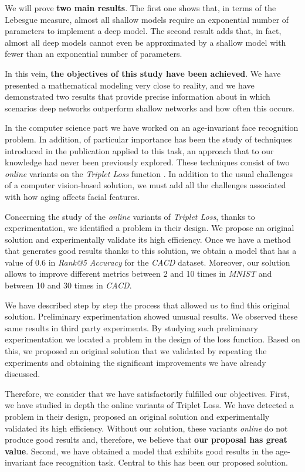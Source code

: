 We will prove \textbf{two main results}. The first one shows that, in terms of the Lebesgue measure, almost all shallow models require an exponential number of parameters to implement a deep model. The second result adds that, in fact, almost all deep models cannot even be approximated by a shallow model with fewer than an exponential number of parameters.

In this vein, \textbf{the objectives of this study have been achieved}. We have presented a mathematical modeling very close to reality, and we have demonstrated two results that provide precise information about in which scenarios deep networks outperform shallow networks and how often this occurs.

In the computer science part we have worked on an age-invariant face recognition problem. In addition, of particular importance has been the study of techniques introduced in the \cite{informatica:principal} publication applied to this task, an approach that to our knowledge had never been previously explored. These techniques consist of two \textit{online} variants on the \textit{Triplet Loss} function \cite{informatica:principal}. In addition to the usual challenges of a computer vision-based solution, we must add all the challenges associated with how aging affects facial features.

Concerning the study of the \textit{online} variants of \textit{Triplet Loss}, thanks to experimentation, we identified a problem in their design. We propose an original solution and experimentally validate its high efficiency. Once we have a method that generates good results thanks to this solution, we obtain a model that has a value of 0.6 in \textit{Rank@5 Accuracy} for the \textit{CACD} dataset. Moreover, our solution allows to improve different metrics between 2 and 10 times in \textit{MNIST} and between 10 and 30 times in \textit{CACD}.

We have described step by step the process that allowed us to find this original solution. Preliminary experimentation showed unusual results. We observed these same results in third party experiments. By studying such preliminary experimentation we located a problem in the design of the loss function. Based on this, we proposed an original solution that we validated by repeating the experiments and obtaining the significant improvements we have already discussed.

Therefore, we consider that we have satisfactorily fulfilled our objectives. First, we have studied in depth the online variants of Triplet Loss. We have detected a problem in their design, proposed an original solution and experimentally validated its high efficiency. Without our solution, these variants \textit{online} do not produce good results and, therefore, we believe that \textbf{our proposal has great value}. Second, we have obtained a model that exhibits good results in the age-invariant face recognition task. Central to this has been our proposed solution.

\endinput

